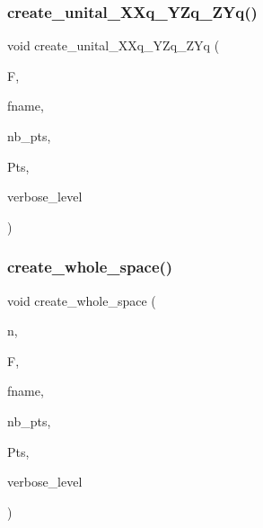 \mbox{\label{geometric__object_8_c_a8b16f0c0b62f3ad69a4f09074cb48866}} 
\subsubsection{\texorpdfstring{create\+\_\+unital\+\_\+\+X\+Xq\+\_\+\+Y\+Zq\+\_\+\+Z\+Yq()}{create\_unital\_XXq\_YZq\_ZYq()}}
{\footnotesize\ttfamily void create\+\_\+unital\+\_\+\+X\+Xq\+\_\+\+Y\+Zq\+\_\+\+Z\+Yq (\begin{DoxyParamCaption}\item[{\mbox{\hyperlink{classfinite__field}{finite\+\_\+field}} $\ast$}]{F,  }\item[{\mbox{\hyperlink{galois_8h_ab6cc7b4aeb6ea31aba2b3fbfc83ff5e6}{B\+Y\+TE}} $\ast$}]{fname,  }\item[{\mbox{\hyperlink{galois_8h_a09fddde158a3a20bd2dcadb609de11dc}{I\+NT}} \&}]{nb\+\_\+pts,  }\item[{\mbox{\hyperlink{galois_8h_a09fddde158a3a20bd2dcadb609de11dc}{I\+NT}} $\ast$\&}]{Pts,  }\item[{\mbox{\hyperlink{galois_8h_a09fddde158a3a20bd2dcadb609de11dc}{I\+NT}}}]{verbose\+\_\+level }\end{DoxyParamCaption})}

\mbox{\label{geometric__object_8_c_ab21c9872fdfad1f952fcd3928d745b88}} 
\subsubsection{\texorpdfstring{create\+\_\+whole\+\_\+space()}{create\_whole\_space()}}
{\footnotesize\ttfamily void create\+\_\+whole\+\_\+space (\begin{DoxyParamCaption}\item[{\mbox{\hyperlink{galois_8h_a09fddde158a3a20bd2dcadb609de11dc}{I\+NT}}}]{n,  }\item[{\mbox{\hyperlink{classfinite__field}{finite\+\_\+field}} $\ast$}]{F,  }\item[{\mbox{\hyperlink{galois_8h_ab6cc7b4aeb6ea31aba2b3fbfc83ff5e6}{B\+Y\+TE}} $\ast$}]{fname,  }\item[{\mbox{\hyperlink{galois_8h_a09fddde158a3a20bd2dcadb609de11dc}{I\+NT}} \&}]{nb\+\_\+pts,  }\item[{\mbox{\hyperlink{galois_8h_a09fddde158a3a20bd2dcadb609de11dc}{I\+NT}} $\ast$\&}]{Pts,  }\item[{\mbox{\hyperlink{galois_8h_a09fddde158a3a20bd2dcadb609de11dc}{I\+NT}}}]{verbose\+\_\+level }\end{DoxyParamCaption})}

